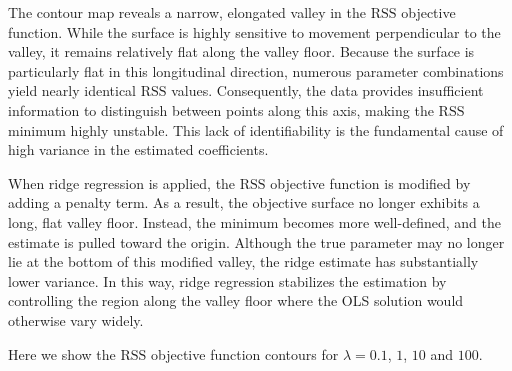 \documentclass[
  letterpaper,
  DIV=11,
  numbers=noendperiod]{scrreprt}
\newcommand{\rss}{\mathrm{RSS}}
\theoremstyle{definition}
\theoremstyle{definition}
\theoremstyle{plain}
\theoremstyle{plain}
\theoremstyle{remark}
\begin{document}
The contour map reveals a narrow, elongated valley in the \(\rss\)
objective function. While the surface is highly sensitive to movement
perpendicular to the valley, it remains relatively flat along the valley
floor. Because the surface is particularly flat in this longitudinal
direction, numerous parameter combinations yield nearly identical
\(\rss\) values. Consequently, the data provides insufficient
information to distinguish between points along this axis, making the
\(\rss\) minimum highly unstable. This lack of identifiability is the
fundamental cause of high variance in the estimated coefficients.

When ridge regression is applied, the \(\rss\) objective function is
modified by adding a penalty term. As a result, the objective surface no
longer exhibits a long, flat valley floor. Instead, the minimum becomes
more well-defined, and the estimate is pulled toward the origin.
Although the true parameter may no longer lie at the bottom of this
modified valley, the ridge estimate has substantially lower variance. In
this way, ridge regression stabilizes the estimation by controlling the
region along the valley floor where the OLS solution would otherwise
vary widely.

Here we show the \(\rss\) objective function contours for
\(\lambda=0.1\), \(1\), \(10\) and \(100\).
\end{document}
